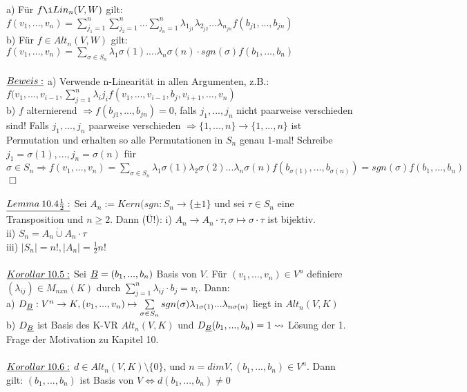 \documentclass[fleqn, a4paper, 11pt]{article}
\begin{document}
a) F\"ur $f\i Lin_n(V,W)$ gilt: $f(v_1,...,v_n)=\sum\limits_{j_1 =1}^n \sum\limits_{j_2 =1}^n ... \sum\limits_{j_n =1}^n \lambda_{1_{j1}}\lambda_{2_{j2}}...\lambda_{n_{jn}}f(b_{j1},...,b_{jn})$\\
b) F\"ur $f\in Alt_n(V,W)$ gilt: $f(v_1,...,v_n)=\sum\limits_{\sigma\in S_n}\lambda_1 \sigma(1)....\lambda_n\sigma(n)\cdot sgn(\sigma)f(b_1,...,b_n)$\\
\\
$\uline{Beweis:}$ a) Verwende n-Linearit\"at in allen Argumenten, z.B.: $f(v_1,...,v_{i-1},\sum\limits_{j=1}^n \lambda_i j_i f(v_1,...,v_{i-1},b_j,v_{i+1},...,v_n)$\\
b) $f$ alternierend $\Rightarrow f(b_{j1},...,b_{jn})=0$, falls $j_1,...,j_n$ nicht paarweise verschieden sind! Falls $j_1,...,j_n$ paarweise verschieden $\Rightarrow \{1,...,n\}\rightarrow\{1,...,n\}$ ist Permutation und erhalten so alle Permutationen in $S_n$ genau 1-mal! Schreibe $j_1=\sigma(1),...,j_n=\sigma(n)$ f\"ur $\sigma\in S_n\Rightarrow f(v_1,...,v_n)=\sum\limits_{\sigma\in S_n} \lambda_1 \sigma(1)\lambda_2\sigma(2)...\lambda_n\sigma(n)f(b_{\sigma(1)},...,b_{\sigma(n)})=sgn(\sigma)f(b_1,...,b_n)$ \hfill $\Box$\\
\\
$\uline{Lemma\:10.4\tfrac{1}{2}:}$ Sei $A_n:=Kern(sgn:S_n\rightarrow\{\pm 1\}$ und sei $\tau\in S_n$ eine Transposition und $n\geq 2$. Dann (\"U!): i) $A_n\rightarrow A_n\cdot\tau,\sigma\mapsto\sigma\cdot\tau$ ist bijektiv.\\
ii) $S_n=A_n\mathbin{\dot{\cup}} A_n\cdot\tau$\\
iii) $|S_n|=n!,|A_n|=\tfrac{1}{2} n!$\\
\\
$\uline{Korollar\:10.5:}$ Sei $\uline{B}=(b_1,...,b_n)$ Basis von $V$. F\"ur $(v_1,...,v_n)\in V^n$ definiere $(\lambda_{ij})\in M_{nxn}(K)$ durch $\sum\limits_{j=1}^n \lambda_{ij}\cdot b_j=v_i$. Dann:\\
a) $D_{\uline{B}}:V^n\rightarrow K,(v_1,...,v_n)\mapsto\sum\limits_{\sigma\in S_n} sgn(\sigma)\lambda_{1\sigma(1)}...\lambda_{n\sigma(n)}$ liegt in $Alt_n(V,K)$\\
b) $D_{\uline{B}}$ ist Basis des K-VR $Alt_n(V,K)$ und $D_{\uline{B}}(b_1,...,b_n)=1\leadsto$ L\"osung der 1. Frage der Motivation zu Kapitel 10.\\
\\
$\uline{Korollar\:10.6:}$ $d\in Alt_n(V,K)\setminus\{0\}$, und $n=dim V,(b_1,...,b_n)\in V^n$. Dann gilt: $(b_1,...,b_n)$ ist Basis von $V\Leftrightarrow d(b_1,...,b_n)\neq 0$\\
\end{document}
